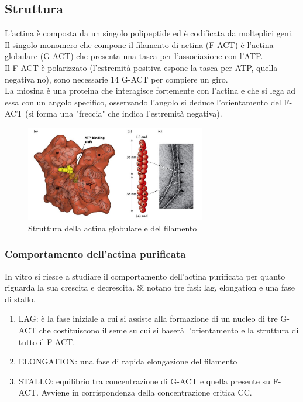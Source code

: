    \subsection{Struttura}
        L'actina è composta da un singolo polipeptide ed è codificata da molteplici geni. Il singolo monomero che compone il filamento di actina (F-ACT) è l'actina globulare (G-ACT) che presenta una tasca per l'associazione con l'ATP.\\
        Il F-ACT è polarizzato (l'estremità positiva espone la tasca per ATP, quella negativa no), sono necessarie 14 G-ACT per compiere un giro.\\
        La miosina è una proteina che interagisce fortemente con l'actina e che si lega ad essa con un angolo specifico, osservando l'angolo si deduce l'orientamento del F-ACT (si forma una "freccia" che indica l'estremità negativa).
        \begin{figure}[h]
            \centering
            \includegraphics[width=0.7\textwidth]{images/G-ACTeF-ACT.JPG}
            \caption{\small Struttura della actina globulare e del filamento}
            \label{fig:mesh1}
        \end{figure}
        
        \subsubsection{Comportamento dell'actina purificata}
            In vitro si riesce a studiare il comportamento dell'actina purificata per quanto riguarda la sua crescita e decrescita. Si notano tre fasi: lag, elongation e una fase di stallo.
            \begin{enumerate}
                \item LAG: è la fase iniziale a cui si assiste alla formazione di un nucleo di tre G-ACT che costituiscono il seme su cui si baserà l'orientamento e la struttura di tutto il F-ACT.
                \item ELONGATION: una fase di rapida elongazione del filamento
                \item STALLO: equilibrio tra concentrazione di G-ACT e quella presente su F-ACT. Avviene in corrispondenza della concentrazione critica CC.
            \end{enumerate}
            
